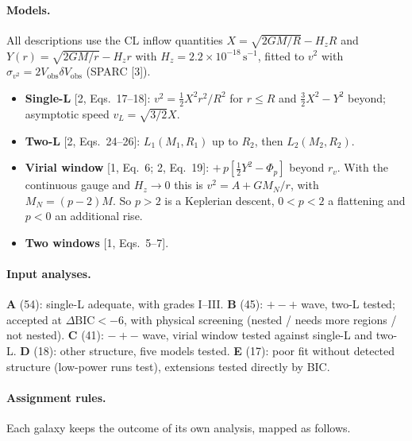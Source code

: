 \documentclass[10pt]{article}
\begin{document}
\paragraph{Models.} All descriptions use the CL inflow quantities $X=\sqrt{2GM/R}-H_zR$ and $Y(r)=\sqrt{2GM/r}-H_zr$ with $H_z=2.2\times10^{-18}\,\mathrm{s^{-1}}$, fitted to $v^2$ with $\sigma_{v^2}=2V_\mathrm{obs}\delta V_\mathrm{obs}$ (SPARC [3]).
\begin{itemize}\itemsep0pt
\item \textbf{Single-L} [2, Eqs.~17--18]: $v^2=\tfrac12X^2r^2/R^2$ for $r\le R$ and $\tfrac32X^2-Y^2$ beyond; asymptotic speed $v_L=\sqrt{3/2}X$.
\item \textbf{Two-L} [2, Eqs.~24--26]: $L_1(M_1,R_1)$ up to $R_2$, then $L_2(M_2,R_2)$.
\item \textbf{Virial window} [1, Eq.~6; 2, Eq.~19]: $+\,p[\tfrac12Y^2-\Phi_p]$ beyond $r_v$. With the continuous gauge and $H_z\to0$ this is $v^2=A+GM_N/r$, with $M_N=(p-2)M$. So $p>2$ is a Keplerian descent, $0<p<2$ a flattening and $p<0$ an additional rise.
\item \textbf{Two windows} [1, Eqs.~5--7].
\end{itemize}
\paragraph{Input analyses.} \textbf{A} (54): single-L adequate, with grades I--III. \textbf{B} (45): $+-+$ wave, two-L tested; accepted at $\Delta\mathrm{BIC}<-6$, with physical screening (nested / needs more regions / not nested). \textbf{C} (41): $-+-$ wave, virial window tested against single-L and two-L. \textbf{D} (18): other structure, five models tested. \textbf{E} (17): poor fit without detected structure (low-power runs test), extensions tested directly by BIC.
\paragraph{Assignment rules.} Each galaxy keeps the outcome of its own analysis, mapped as follows.
\end{document}
